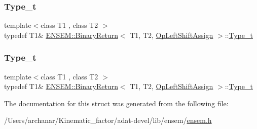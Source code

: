 \mbox{\label{structENSEM_1_1BinaryReturn_3_01T1_00_01T2_00_01OpLeftShiftAssign_01_4_a86e3783b9979825629679e9fc7023298}} 
\subsubsection{\texorpdfstring{Type\_t}{Type\_t}\hspace{0.1cm}{\footnotesize\ttfamily [2/3]}}
{\footnotesize\ttfamily template$<$class T1 , class T2 $>$ \\
typedef T1\& \mbox{\hyperlink{structENSEM_1_1BinaryReturn}{E\+N\+S\+E\+M\+::\+Binary\+Return}}$<$ T1, T2, \mbox{\hyperlink{structENSEM_1_1OpLeftShiftAssign}{Op\+Left\+Shift\+Assign}} $>$\+::\mbox{\hyperlink{structENSEM_1_1BinaryReturn_3_01T1_00_01T2_00_01OpLeftShiftAssign_01_4_a86e3783b9979825629679e9fc7023298}{Type\+\_\+t}}}

\mbox{\label{structENSEM_1_1BinaryReturn_3_01T1_00_01T2_00_01OpLeftShiftAssign_01_4_a86e3783b9979825629679e9fc7023298}} 
\subsubsection{\texorpdfstring{Type\_t}{Type\_t}\hspace{0.1cm}{\footnotesize\ttfamily [3/3]}}
{\footnotesize\ttfamily template$<$class T1 , class T2 $>$ \\
typedef T1\& \mbox{\hyperlink{structENSEM_1_1BinaryReturn}{E\+N\+S\+E\+M\+::\+Binary\+Return}}$<$ T1, T2, \mbox{\hyperlink{structENSEM_1_1OpLeftShiftAssign}{Op\+Left\+Shift\+Assign}} $>$\+::\mbox{\hyperlink{structENSEM_1_1BinaryReturn_3_01T1_00_01T2_00_01OpLeftShiftAssign_01_4_a86e3783b9979825629679e9fc7023298}{Type\+\_\+t}}}



The documentation for this struct was generated from the following file\+:\begin{DoxyCompactItemize}
\item 
/\+Users/archanar/\+Kinematic\+\_\+factor/adat-\/devel/lib/ensem/\mbox{\hyperlink{adat-devel_2lib_2ensem_2ensem_8h}{ensem.\+h}}\end{DoxyCompactItemize}
